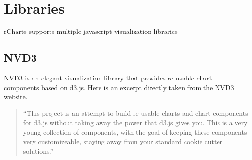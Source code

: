 \documentclass[letterpaper,10pt,english]{sphinxmanual}
\begin{document}
\chapter{Libraries}
\label{libraries/index::doc}\label{libraries/index:id1}\label{libraries/index:libraries}
rCharts supports multiple javascript visualization libraries


\section{NVD3}
\label{nvd3/index::doc}\label{nvd3/index:nvd3}\label{nvd3/index:intro}
\href{http://nvd3.org}{NVD3} is an elegant visualization library that provides re-usable chart components based on d3.js. Here is an excerpt directly taken from the NVD3 website.
\begin{quote}

``This project is an attempt to build re-usable charts and chart components for d3.js without taking away the power that d3.js gives you. This is a very young collection of components, with the goal of keeping these components very customizeable, staying away from your standard cookie cutter solutions.''
\end{quote}
\end{document}
